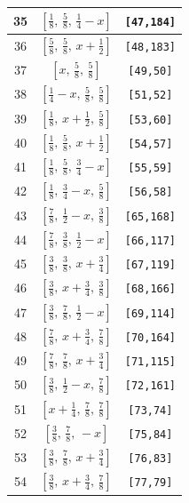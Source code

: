 \documentclass[fleqn,8pt]{jsarticle}
\begin{document}
\begin{longtable}{ccc}
35 & $\left[ \frac{1}{8},\, \frac{5}{8},\, \frac{1}{4} - x \right]$ & {\tt [47,184]} \\ \hline
36 & $\left[ \frac{5}{8},\, \frac{5}{8},\, x + \frac{1}{2} \right]$ & {\tt [48,183]} \\ \hline
37 & $\left[ x,\, \frac{5}{8},\, \frac{5}{8} \right]$ & {\tt [49,50]} \\ \hline
38 & $\left[ \frac{1}{4} - x,\, \frac{5}{8},\, \frac{5}{8} \right]$ & {\tt [51,52]} \\ \hline
39 & $\left[ \frac{1}{8},\, x + \frac{1}{2},\, \frac{5}{8} \right]$ & {\tt [53,60]} \\ \hline
40 & $\left[ \frac{1}{8},\, \frac{5}{8},\, x + \frac{1}{2} \right]$ & {\tt [54,57]} \\ \hline
41 & $\left[ \frac{1}{8},\, \frac{5}{8},\, \frac{3}{4} - x \right]$ & {\tt [55,59]} \\ \hline
42 & $\left[ \frac{1}{8},\, \frac{3}{4} - x,\, \frac{5}{8} \right]$ & {\tt [56,58]} \\ \hline
43 & $\left[ \frac{7}{8},\, \frac{1}{2} - x,\, \frac{3}{8} \right]$ & {\tt [65,168]} \\ \hline
44 & $\left[ \frac{7}{8},\, \frac{3}{8},\, \frac{1}{2} - x \right]$ & {\tt [66,117]} \\ \hline
45 & $\left[ \frac{3}{8},\, \frac{3}{8},\, x + \frac{3}{4} \right]$ & {\tt [67,119]} \\ \hline
46 & $\left[ \frac{3}{8},\, x + \frac{3}{4},\, \frac{3}{8} \right]$ & {\tt [68,166]} \\ \hline
47 & $\left[ \frac{3}{8},\, \frac{7}{8},\, \frac{1}{2} - x \right]$ & {\tt [69,114]} \\ \hline
48 & $\left[ \frac{7}{8},\, x + \frac{3}{4},\, \frac{7}{8} \right]$ & {\tt [70,164]} \\ \hline
49 & $\left[ \frac{7}{8},\, \frac{7}{8},\, x + \frac{3}{4} \right]$ & {\tt [71,115]} \\ \hline
50 & $\left[ \frac{3}{8},\, \frac{1}{2} - x,\, \frac{7}{8} \right]$ & {\tt [72,161]} \\ \hline
51 & $\left[ x + \frac{1}{4},\, \frac{7}{8},\, \frac{7}{8} \right]$ & {\tt [73,74]} \\ \hline
52 & $\left[ \frac{3}{8},\, \frac{7}{8},\, - x \right]$ & {\tt [75,84]} \\ \hline
53 & $\left[ \frac{3}{8},\, \frac{7}{8},\, x + \frac{3}{4} \right]$ & {\tt [76,83]} \\ \hline
54 & $\left[ \frac{3}{8},\, x + \frac{3}{4},\, \frac{7}{8} \right]$ & {\tt [77,79]} \\ \hline

\end{longtable}
\end{document}
